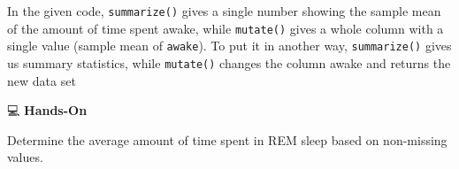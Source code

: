 \documentclass[
  letterpaper,
  DIV=11,
  numbers=noendperiod]{scrreprt}
\begin{document}
\begin{tcolorbox}[enhanced jigsaw, colbacktitle=quarto-callout-tip-color!10!white, opacitybacktitle=0.6, breakable, left=2mm, leftrule=.75mm, toprule=.15mm, toptitle=1mm, bottomtitle=1mm, colframe=quarto-callout-tip-color-frame, opacityback=0, coltitle=black, arc=.35mm, titlerule=0mm, colback=white, bottomrule=.15mm, title=\textcolor{quarto-callout-tip-color}{\faLightbulb}\hspace{0.5em}{Answer}, rightrule=.15mm]

In the given code, \texttt{summarize()} gives a single number showing
the sample mean of the amount of time spent awake, while
\texttt{mutate()} gives a whole column with a single value (sample mean
of \texttt{awake}). To put it in another way, \texttt{summarize()} gives
us summary statistics, while \texttt{mutate()} changes the column awake
and returns the new data set

\end{tcolorbox}

💻 \textbf{Hands-On}

Determine the average amount of time spent in REM sleep based on
non-missing values.
\end{document}
